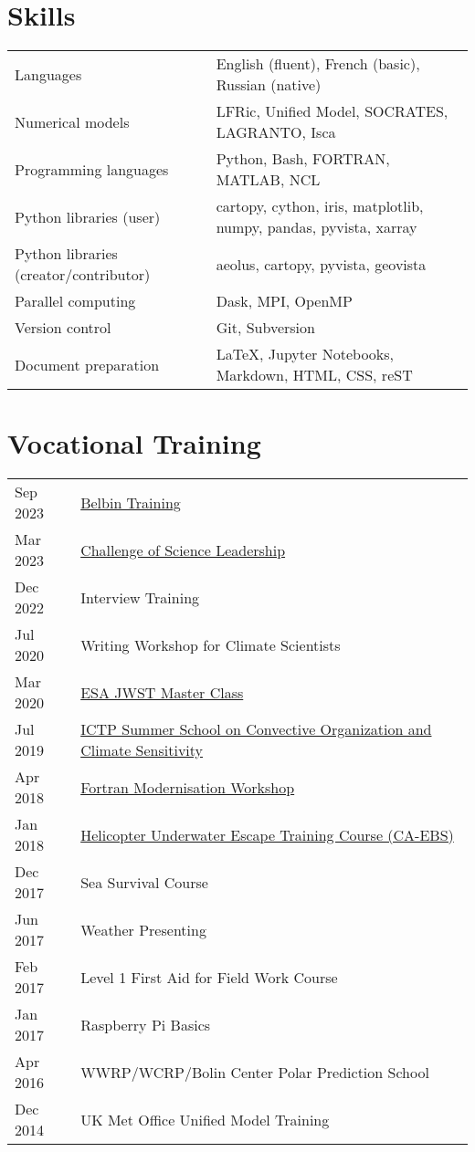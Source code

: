 \documentclass[a4paper, 11pt]{article}
\begin{document}
\section{Skills}
\begin{tabularx}{\linewidth}{@{}l X@{}}
Languages & English (fluent), French (basic), Russian (native) \\
Numerical models & LFRic, Unified Model, SOCRATES, LAGRANTO, Isca \\
Programming languages & Python, Bash, FORTRAN, MATLAB, NCL \\
Python libraries (user) & cartopy, cython, iris, matplotlib, numpy, pandas, pyvista, xarray \\
Python libraries (creator/contributor) & aeolus, cartopy, pyvista, geovista \\
Parallel computing & Dask, MPI, OpenMP \\
Version control & Git, Subversion \\
Document preparation & \LaTeX, Jupyter Notebooks, Markdown, HTML, CSS, reST
\end{tabularx}

\section{Vocational Training}
\begin{tabularx}{\linewidth}{@{}l X@{}}
Sep 2023 & \href{https://www.belbin.com}{Belbin Training} \\
Mar 2023 & \href{http://www.scienceleadership.co.uk}{Challenge of Science Leadership} \\
Dec 2022 & Interview Training \\
Jul 2020 & Writing Workshop for Climate Scientists \\
Mar 2020 & \href{https://ers-imaging.github.io/uk_workshop}{ESA JWST Master Class} \\
Jul 2019 & \href{https://indico.ictp.it/event/8669}{ICTP Summer School on Convective Organization and Climate Sensitivity} \\
Apr 2018 & \href{https://www.nag.com/content/fortran-modernization-workshop}{Fortran Modernisation Workshop} \\
Jan 2018 & \href{http://www.petans.co.uk/courses/survival/huet-caebs/}{Helicopter Underwater Escape Training Course (CA-EBS)} \\
Dec 2017 & Sea Survival Course \\
Jun 2017 & Weather Presenting \\
Feb 2017 & Level 1 First Aid for Field Work Course \\
Jan 2017 & Raspberry Pi Basics \\
Apr 2016 & WWRP/WCRP/Bolin Center Polar Prediction School \\
Dec 2014 & UK Met Office Unified Model Training \\
\end{tabularx}
\end{document}
